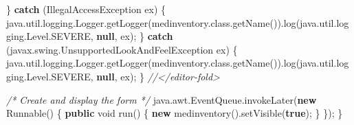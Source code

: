 \documentclass[
  10pt,
]{article}
\newenvironment{Shaded}{}{}
\newcommand{\BuiltInTok}[1]{\textcolor[rgb]{0.00,0.50,0.00}{#1}}
\newcommand{\CommentTok}[1]{\textcolor[rgb]{0.38,0.63,0.69}{\textit{#1}}}
\newcommand{\ControlFlowTok}[1]{\textcolor[rgb]{0.00,0.44,0.13}{\textbf{#1}}}
\newcommand{\DataTypeTok}[1]{\textcolor[rgb]{0.56,0.13,0.00}{#1}}
\newcommand{\FunctionTok}[1]{\textcolor[rgb]{0.02,0.16,0.49}{#1}}
\newcommand{\KeywordTok}[1]{\textcolor[rgb]{0.00,0.44,0.13}{\textbf{#1}}}
\newcommand{\NormalTok}[1]{#1}
\newcommand{\OperatorTok}[1]{\textcolor[rgb]{0.40,0.40,0.40}{#1}}
\begin{document}
\begin{Shaded}
\begin{Highlighting}[numbers=left,,]
        \OperatorTok{\}} \ControlFlowTok{catch} \OperatorTok{(}\BuiltInTok{IllegalAccessException}\NormalTok{ ex}\OperatorTok{)} \OperatorTok{\{}
\NormalTok{            java}\OperatorTok{.}\FunctionTok{util}\OperatorTok{.}\FunctionTok{logging}\OperatorTok{.}\FunctionTok{Logger}\OperatorTok{.}\FunctionTok{getLogger}\OperatorTok{(}\NormalTok{medinventory}\OperatorTok{.}\FunctionTok{class}\OperatorTok{.}\FunctionTok{getName}\OperatorTok{()).}\FunctionTok{log}\OperatorTok{(}\NormalTok{java}\OperatorTok{.}\FunctionTok{util}\OperatorTok{.}\FunctionTok{logging}\OperatorTok{.}\FunctionTok{Level}\OperatorTok{.}\FunctionTok{SEVERE}\OperatorTok{,} \KeywordTok{null}\OperatorTok{,}\NormalTok{ ex}\OperatorTok{);}
        \OperatorTok{\}} \ControlFlowTok{catch} \OperatorTok{(}\NormalTok{javax}\OperatorTok{.}\FunctionTok{swing}\OperatorTok{.}\FunctionTok{UnsupportedLookAndFeelException}\NormalTok{ ex}\OperatorTok{)} \OperatorTok{\{}
\NormalTok{            java}\OperatorTok{.}\FunctionTok{util}\OperatorTok{.}\FunctionTok{logging}\OperatorTok{.}\FunctionTok{Logger}\OperatorTok{.}\FunctionTok{getLogger}\OperatorTok{(}\NormalTok{medinventory}\OperatorTok{.}\FunctionTok{class}\OperatorTok{.}\FunctionTok{getName}\OperatorTok{()).}\FunctionTok{log}\OperatorTok{(}\NormalTok{java}\OperatorTok{.}\FunctionTok{util}\OperatorTok{.}\FunctionTok{logging}\OperatorTok{.}\FunctionTok{Level}\OperatorTok{.}\FunctionTok{SEVERE}\OperatorTok{,} \KeywordTok{null}\OperatorTok{,}\NormalTok{ ex}\OperatorTok{);}
        \OperatorTok{\}}
        \CommentTok{//\textless{}/editor{-}fold\textgreater{}}

        \CommentTok{/* Create and display the form */}
\NormalTok{        java}\OperatorTok{.}\FunctionTok{awt}\OperatorTok{.}\FunctionTok{EventQueue}\OperatorTok{.}\FunctionTok{invokeLater}\OperatorTok{(}\KeywordTok{new} \BuiltInTok{Runnable}\OperatorTok{()} \OperatorTok{\{}
            \KeywordTok{public} \DataTypeTok{void} \FunctionTok{run}\OperatorTok{()} \OperatorTok{\{}
                \KeywordTok{new} \FunctionTok{medinventory}\OperatorTok{().}\FunctionTok{setVisible}\OperatorTok{(}\KeywordTok{true}\OperatorTok{);}
            \OperatorTok{\}}
        \OperatorTok{\});}
    \OperatorTok{\}}


\end{Highlighting}
\end{Shaded}
\end{document}
